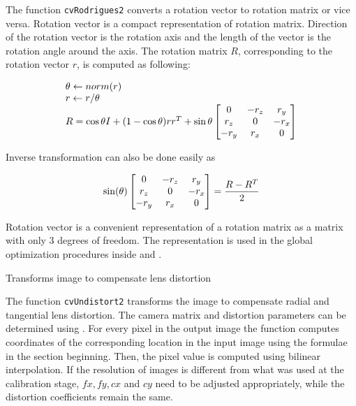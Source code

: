 The function \texttt{cvRodrigues2} converts a rotation vector to rotation matrix or vice versa. Rotation vector is a compact representation of rotation matrix. Direction of the rotation vector is the rotation axis and the length of the vector is the rotation angle around the axis. The rotation matrix $R$, corresponding to the rotation vector $r$, is computed as following:

\[
\begin{array}{l}
\theta \leftarrow norm(r)\\
r \leftarrow r/\theta\\
R = \cos{\theta} I + (1-\cos{\theta}) r r^T + \sin{\theta}
\begin{bmatrix} 0 & -r_z & r_y\\ r_z & 0 & -r_x\\ -r_y & r_x & 0 \end{bmatrix}
\end{array}
\]

Inverse transformation can also be done easily as

\[
\sin(\theta)
\begin{bmatrix} 0 & -r_z & r_y\\ r_z & 0 & -r_x\\ -r_y & r_x & 0 \end{bmatrix}
=
\frac{R - R^T}{2}
\]

Rotation vector is a convenient representation of a rotation matrix
as a matrix with only 3 degrees of freedom. The representation is
used in the global optimization procedures inside
and .

\label{Undistort2}

Transforms image to compensate lens distortion


\begin{description}
\end{description}

The function \texttt{cvUndistort2} transforms the image to compensate
radial and tangential lens distortion. The camera matrix and
distortion parameters can be determined using
. For every
pixel in the output image the function computes coordinates of the
corresponding location in the input image using the formulae in the
section beginning. Then, the pixel value is computed using bilinear
interpolation. If the resolution of images is different from what
was used at the calibration stage, $fx, fy, cx$ and $cy$
need to be adjusted appropriately, while the distortion coefficients
remain the same.

